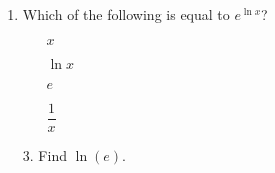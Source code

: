 \documentclass[11pt]{article}
\begin{document}
\pagestyle{empty}
\newsavebox{\quizfront}
\begin{lrbox}{\quizfront}
\begin{minipage}[top][4.5in][t]{\textwidth} \setlength{\parindent}{1.5em}
\drawtitle
\vspace{-0.5in}
\begin{enumerate}

\item Which of the following is equal to $\displaystyle e^{\ln x}$?
  \vfill
  \begin{itemize}
  \item[\textbigcircle] $x$
    \vfill
  \item[\textbigcircle] $\ln x$
    \vfill
  \item[\textbigcircle] $e$
    \vfill
  \item[\textbigcircle] $\dfrac{1}{x}$
    \vfill
  \end{itemize}
\end{enumerate}



\end{minipage}
\end{lrbox}

\newsavebox{\quizback}
\begin{lrbox}{\quizback}
\begin{minipage}[top][4.5in][t]{\textwidth} \setlength{\parindent}{1.5em}
\begin{itemize}
 \item[3.] Find $\ln(e)$. 


\end{itemize}
\end{minipage}
\end{lrbox}

\noindent \usebox{\quizfront}
\vfill
\noindent \usebox{\quizfront}

\end{document}
